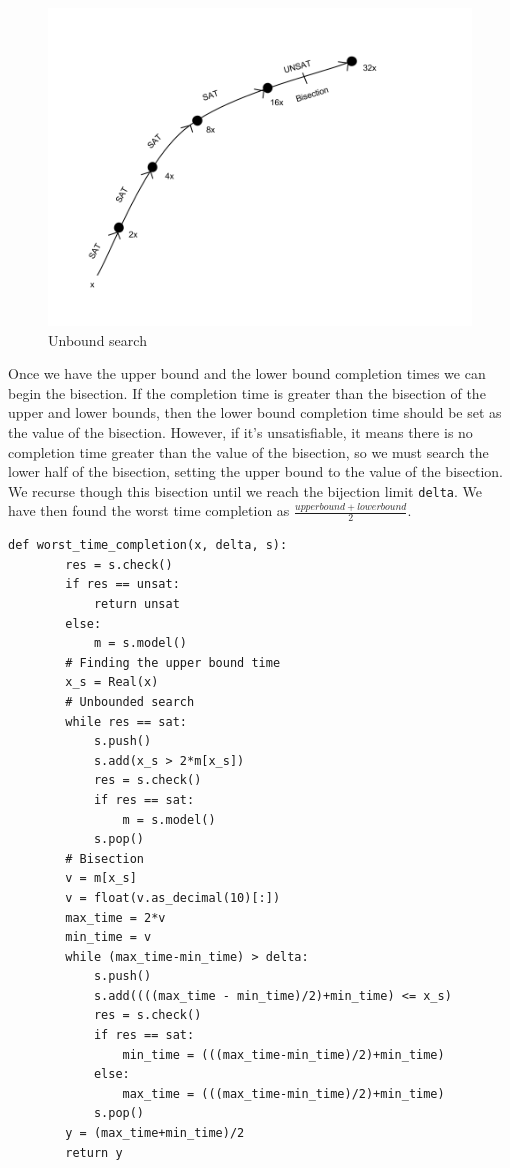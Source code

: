 \documentclass[a4paper]{report}
\begin{document}
\begin{figure}[h]
\center
\includegraphics[scale=0.35]{UnboundSearch.png}
\caption{Unbound search}
\label{fig:Unbound search}
\end{figure}

Once we have the upper bound and the lower bound completion times we can begin the bisection. If the completion time is greater than the bisection of the upper and lower bounds, then the lower bound completion time should be set as the value of the bisection. However, if it's unsatisfiable, it means there is no completion time greater than the value of the bisection, so we must search the lower half of the bisection, setting the upper bound to the value of the bisection. We recurse though this bisection until we reach the bijection limit \texttt{delta}. We have then found the worst time completion as $\frac{upperbound + lowerbound}{2}$.

\begin{lstlisting}[frame=single]
def worst_time_completion(x, delta, s):
        res = s.check()
        if res == unsat:
            return unsat
        else:
            m = s.model()
        # Finding the upper bound time
        x_s = Real(x)
        # Unbounded search
        while res == sat:
            s.push()
            s.add(x_s > 2*m[x_s])
            res = s.check()
            if res == sat:
                m = s.model()
            s.pop()
        # Bisection
        v = m[x_s]
        v = float(v.as_decimal(10)[:])
        max_time = 2*v
        min_time = v
        while (max_time-min_time) > delta:
            s.push()
            s.add((((max_time - min_time)/2)+min_time) <= x_s)
            res = s.check()
            if res == sat:
                min_time = (((max_time-min_time)/2)+min_time)
            else:
                max_time = (((max_time-min_time)/2)+min_time)
            s.pop()
        y = (max_time+min_time)/2
        return y 
\end{lstlisting}
\end{document}
